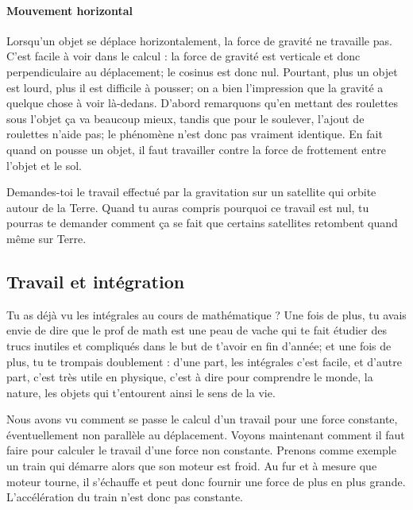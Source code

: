 \paragraph{Mouvement horizontal}

Lorsqu'un objet se déplace horizontalement, la force de gravité ne travaille pas. C'est facile à voir dans le calcul : la force de gravité est verticale et donc perpendiculaire au déplacement; le cosinus est donc nul. Pourtant, plus un objet est lourd, plus il est difficile à pousser; on a bien l'impression que la gravité a quelque chose à voir là-dedans. D'abord remarquons qu'en mettant des roulettes sous l'objet ça va beaucoup mieux, tandis que pour le soulever, l'ajout de roulettes n'aide pas; le phénomène n'est donc pas vraiment identique. En fait quand on pousse un objet, il faut travailler contre la force de frottement entre l'objet et le sol.

\begin{exercice}
Demandes-toi le travail effectué par la gravitation sur un satellite qui orbite autour de la Terre. Quand tu auras compris pourquoi ce travail est nul, tu pourras te demander comment ça se fait que certains satellites retombent quand même sur Terre.
\end{exercice}


\subsection{Travail et intégration}

Tu as déjà vu les intégrales au cours de mathématique ? Une fois de plus, tu avais envie de dire que le prof de math est une peau de vache qui te fait étudier des trucs inutiles et compliqués dans le but de t'avoir en fin d'année; et une fois de plus, tu te trompais doublement : d'une part, les intégrales c'est facile, et d'autre part, c'est très utile en physique, c'est à dire pour comprendre le monde, la nature, les objets qui t'entourent ainsi le sens de la vie.

Nous avons vu comment se passe le calcul d'un travail pour une force constante, éventuellement non parallèle au déplacement. Voyons maintenant comment il faut faire pour calculer le travail d'une force non constante. Prenons comme exemple un train qui démarre alors que son moteur est froid. Au fur et à mesure que moteur tourne, il s'échauffe et peut donc fournir une force de plus en plus grande. L'accélération du train n'est donc pas constante.

